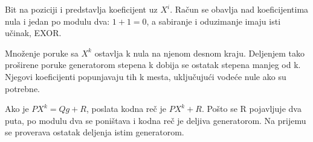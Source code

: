 Bit na poziciji i predstavlja koeficijent uz $X^i$. Račun se obavlja nad koeficijentima nula i jedan po modulu dva: $1+1=0$, a sabiranje i oduzimanje imaju isti učinak, EXOR.

Množenje poruke sa $X^k$ ostavlja k nula na njenom desnom kraju. Deljenjem tako proširene poruke generatorom stepena k dobija se ostatak stepena manjeg od k. Njegovi koeficijenti popunjavaju tih k mesta, uključujući vodeće nule ako su potrebne.

Ako je $PX^k=Qg+R$, poslata kodna reč je $PX^k+R$. Pošto se R pojavljuje dva puta, po modulu dva se poništava i kodna reč je deljiva generatorom. Na prijemu se proverava ostatak deljenja istim generatorom.
